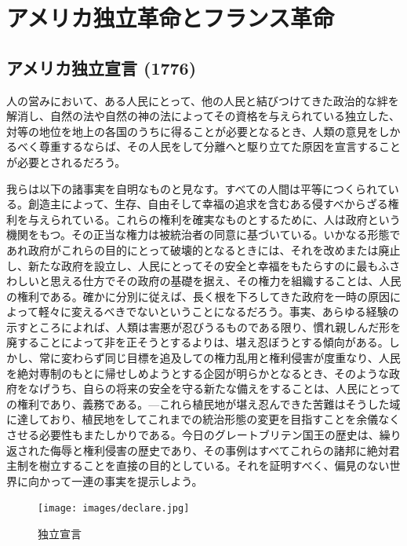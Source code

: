 
\chapter{アメリカ独立革命とフランス革命}



\section{アメリカ独立宣言 (1776)}

\label{independence}
人の営みにおいて、ある人民にとって、他の人民と結びつけてきた政治的な絆を解消し、自然の法や自然の神の法によってその資格を与えられている独立した、対等の地位を地上の各国のうちに得ることが必要となるとき、人類の意見をしかるべく尊重するならば、その人民をして分離へと駆り立てた原因を宣言することが必要とされるだろう。

我らは以下の諸事実を自明なものと見なす。すべての人間は平等につくられている。創造主によって、生存、自由そして幸福の追求を含むある侵すべからざる権利を与えられている。これらの権利を確実なものとするために、人は政府という機関をもつ。その正当な権力は被統治者の同意に基づいている。いかなる形態であれ政府がこれらの目的にとって破壊的となるときには、それを改めまたは廃止し、新たな政府を設立し、人民にとってその安全と幸福をもたらすのに最もふさわしいと思える仕方でその政府の基礎を据え、その権力を組織することは、人民の権利である。確かに分別に従えば、長く根を下ろしてきた政府を一時の原因によって軽々に変えるべきでないということになるだろう。事実、あらゆる経験の示すところによれば、人類は害悪が忍びうるものである限り、慣れ親しんだ形を廃することによって非を正そうとするよりは、堪え忍ぼうとする傾向がある。しかし、常に変わらず同じ目標を追及しての権力乱用と権利侵害が度重なり、人民を絶対専制のもとに帰せしめようとする企図が明らかとなるとき、そのような政府をなげうち、自らの将来の安全を守る新たな備えをすることは、人民にとっての権利であり、義務である。—これら植民地が堪え忍んできた苦難はそうした域に達しており、植民地をしてこれまでの統治形態の変更を目指すことを余儀なくさせる必要性もまたしかりである。今日のグレートブリテン国王の歴史は、繰り返された侮辱と権利侵害の歴史であり、その事例はすべてこれらの諸邦に絶対君主制を樹立することを直接の目的としている。それを証明すべく、偏見のない世界に向かって一連の事実を提示しよう。



 \begin{figure}[htbp]
   \centering
     \texttt{[image: images/declare.jpg]}
     \caption{独立宣言} 
 \end{figure}



